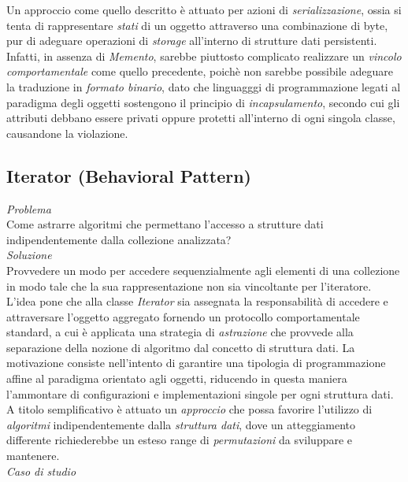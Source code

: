 \documentclass{article}
\begin{document}
Un approccio come quello descritto è attuato per azioni di \textit{serializzazione}, ossia si tenta di rappresentare \textit{stati} di un oggetto attraverso una combinazione di byte, pur di adeguare operazioni di \textit{storage} all'interno di strutture dati persistenti. Infatti, in assenza di \textit{Memento}, sarebbe piuttosto complicato realizzare un \textit{vincolo comportamentale} come quello precedente, poichè non sarebbe possibile adeguare la traduzione in \textit{formato binario}, dato che linguagggi di programmazione legati al paradigma degli oggetti sostengono il principio di \textit{incapsulamento}, secondo cui gli attributi debbano essere privati oppure protetti all'interno di ogni singola classe, causandone la violazione.

\subsection*{Iterator (Behavioral Pattern)}
\large
\textit{Problema}\\
Come astrarre algoritmi che permettano l'accesso a strutture dati indipendentemente dalla collezione analizzata?\vspace*{14pt}\\
\textit{Soluzione}\\
Provvedere un modo per accedere sequenzialmente agli elementi di una collezione in modo tale che la sua rappresentazione non sia vincoltante per l'iteratore.\vspace*{14pt}\\
L'idea pone che alla classe \textit{Iterator} sia assegnata la responsabilità di accedere e attraversare l'oggetto aggregato fornendo un protocollo comportamentale standard, a cui è applicata una strategia di \textit{astrazione} che provvede alla separazione della nozione di algoritmo dal concetto di struttura dati. 
La motivazione consiste nell'intento di garantire una tipologia di programmazione affine al paradigma orientato agli oggetti, riducendo in questa maniera l'ammontare di configurazioni e implementazioni singole per ogni struttura dati.\vspace*{7pt}\\
A titolo semplificativo è attuato un \textit{approccio} che possa favorire l'utilizzo di \textit{algoritmi} indipendentemente dalla \textit{struttura dati}, dove un atteggiamento differente richiederebbe un esteso range di \textit{permutazioni} da sviluppare e mantenere.\vspace*{14pt}\\
\textit{Caso di studio}\\
\end{document}
